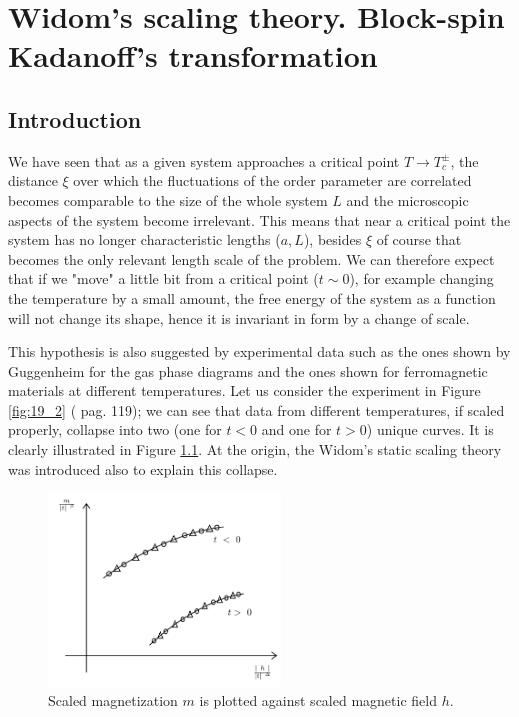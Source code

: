 \documentclass[../main/main.tex]{subfiles}
\begin{document}
\chapter{Widom's scaling theory. Block-spin Kadanoff's transformation}


\section{Introduction}
We have seen  that as a given system approaches a critical point \( T \rightarrow T_c^{\pm} \), the distance \( \xi  \)  over which the fluctuations of the order parameter are correlated becomes comparable to the size of the whole system \( L \) and the microscopic aspects of the system become irrelevant. This means that near a critical point the system has no longer characteristic lengths (\( a,L \)), besides \( \xi  \) of course that becomes the only relevant length scale of the problem. We can therefore expect that if we "move" a little bit from a critical point (\( t \sim 0 \)), for example changing the temperature by a small amount, the free energy of the system as a function will not change its shape, hence it is invariant in form by a change of scale.

 This hypothesis is also suggested by experimental data such as the ones shown by Guggenheim for the gas phase diagrams and the ones shown for ferromagnetic materials at different temperatures. Let us consider the experiment in Figure \ref{fig:19_2} (\cite{3_lesson_3} pag. 119); we can see that data from different temperatures, if scaled properly, collapse into two (one for \( t<0 \) and one for \( t>0 \)) unique curves. It is clearly illustrated in Figure \ref{fig:19_1}. At the origin, the Widom's static scaling theory was introduced also to explain this collapse.

 \begin{figure}[h!]
 \centering
 \includegraphics[width=0.55\textwidth]{../lessons/19_image/1.pdf}
 \caption{\label{fig:19_1} Scaled magnetization \( m \) is plotted against scaled magnetic field \( h \).}
 \end{figure}
\end{document}
